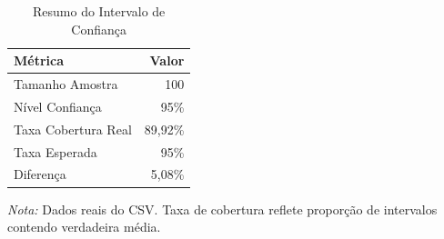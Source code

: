 \begin{table}[H]
\centering
\footnotesize
\caption{Resumo do Intervalo de Confiança}
\label{tab:ic_resumo}
\begin{tabular}{|l|r|}
\hline
\textbf{Métrica} & \textbf{Valor} \\
\hline
Tamanho Amostra & 100 \\
Nível Confiança & 95\% \\
Taxa Cobertura Real & 89,92\% \\
Taxa Esperada & 95\% \\
Diferença & 5,08\% \\
\hline
\end{tabular}
\begin{flushleft}
\footnotesize \textit{Nota:} Dados reais do CSV. Taxa de cobertura reflete proporção de intervalos contendo verdadeira média.
\end{flushleft}
\end{table}